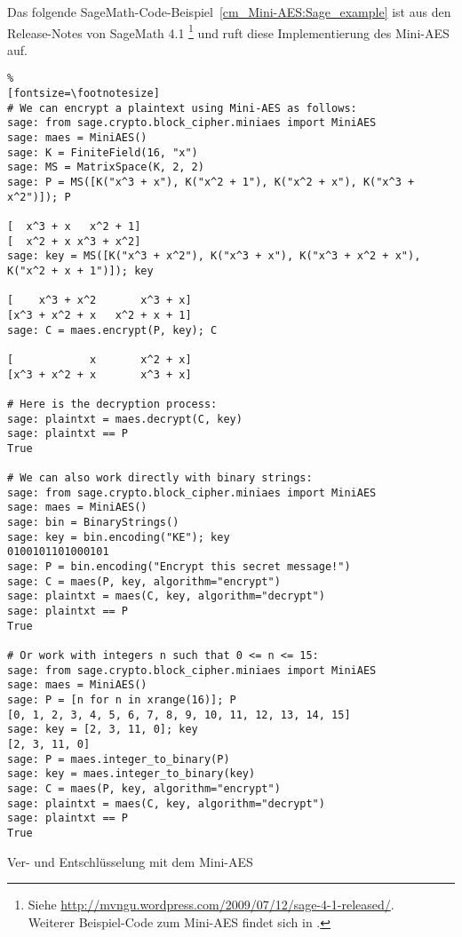 Das folgende SageMath-Code-Beispiel~\ref{cm_Mini-AES:Sage_example}
ist aus den Release-Notes von SageMath 4.1%
\footnote{
  Siehe \url{http://mvngu.wordpress.com/2009/07/12/sage-4-1-released/}.\\
  Weiterer Beispiel-Code zum Mini-AES findet sich in
  \cite[Kap. 6.5 und Anhang D]{Nguyen2009a}.
}
und ruft diese Implementierung des Mini-AES auf.


\begin{sagecode}
\begin{Verbatim}%
[fontsize=\footnotesize]
# We can encrypt a plaintext using Mini-AES as follows:
sage: from sage.crypto.block_cipher.miniaes import MiniAES
sage: maes = MiniAES()
sage: K = FiniteField(16, "x")
sage: MS = MatrixSpace(K, 2, 2)
sage: P = MS([K("x^3 + x"), K("x^2 + 1"), K("x^2 + x"), K("x^3 + x^2")]); P

[  x^3 + x   x^2 + 1]
[  x^2 + x x^3 + x^2]
sage: key = MS([K("x^3 + x^2"), K("x^3 + x"), K("x^3 + x^2 + x"), K("x^2 + x + 1")]); key

[    x^3 + x^2       x^3 + x]
[x^3 + x^2 + x   x^2 + x + 1]
sage: C = maes.encrypt(P, key); C

[            x       x^2 + x]
[x^3 + x^2 + x       x^3 + x]

# Here is the decryption process:
sage: plaintxt = maes.decrypt(C, key)
sage: plaintxt == P
True

# We can also work directly with binary strings:
sage: from sage.crypto.block_cipher.miniaes import MiniAES
sage: maes = MiniAES()
sage: bin = BinaryStrings()
sage: key = bin.encoding("KE"); key
0100101101000101
sage: P = bin.encoding("Encrypt this secret message!")
sage: C = maes(P, key, algorithm="encrypt")
sage: plaintxt = maes(C, key, algorithm="decrypt")
sage: plaintxt == P
True

# Or work with integers n such that 0 <= n <= 15:
sage: from sage.crypto.block_cipher.miniaes import MiniAES
sage: maes = MiniAES()
sage: P = [n for n in xrange(16)]; P
[0, 1, 2, 3, 4, 5, 6, 7, 8, 9, 10, 11, 12, 13, 14, 15]
sage: key = [2, 3, 11, 0]; key
[2, 3, 11, 0]
sage: P = maes.integer_to_binary(P)
sage: key = maes.integer_to_binary(key)
sage: C = maes(P, key, algorithm="encrypt")
sage: plaintxt = maes(C, key, algorithm="decrypt")
sage: plaintxt == P
True
\end{Verbatim}
\caption{Ver- und Entschlüsselung mit dem Mini-AES}
\label{cm_Mini-AES:Sage_example}
\end{sagecode}
\clearpage%


